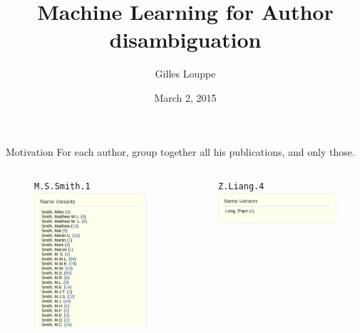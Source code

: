 \documentclass{beamer}
\title{\bf Machine Learning for Author disambiguation}
\author{Gilles Louppe}
\institute{CERN}
\date{March 2, 2015}
\begin{document}
\begin{frame}
\titlepage
\end{frame}



\begin{frame}{Motivation}
For each author, group together all his publications, and only those.

\footnotesize{
\begin{columns}[T]

\begin{column}{0.33\textwidth}
\begin{figure}
\texttt{M.S.Smith.1}
\includegraphics[width=\textwidth]{figures/no-more.png}
\end{figure}
\end{column}
\begin{column}{0.33\textwidth}
\begin{figure}
\texttt{Z.Liang.4}
\includegraphics[width=\textwidth]{figures/no-less.png}


\end{figure}
\end{column}
\end{columns}}
\end{frame}
\end{document}
